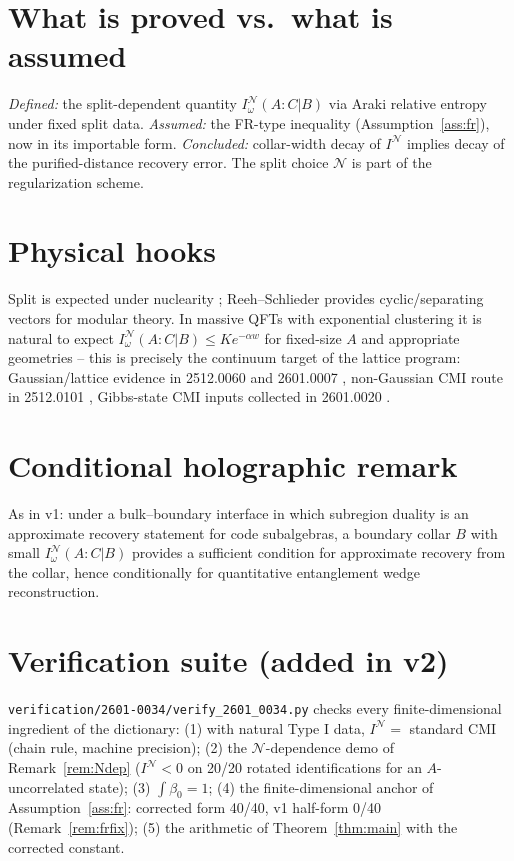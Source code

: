 \documentclass[11pt]{article}
\theoremstyle{remark}
\begin{document}
\section{What is proved vs.\ what is assumed}
\emph{Defined:} the split-dependent quantity $I^{\mathcal{N}}_\omega
(A:C|B)$ via Araki relative entropy under fixed split data.
\emph{Assumed:} the FR-type inequality (Assumption~\ref{ass:fr}), now in
its importable form. \emph{Concluded:} collar-width decay of
$I^{\mathcal{N}}$ implies decay of the purified-distance recovery error.
The split choice $\mathcal{N}$ is part of the regularization scheme.

\section{Physical hooks}
Split is expected under nuclearity \cite{BW}; Reeh--Schlieder provides
cyclic/separating vectors for modular theory. In massive QFTs with
exponential clustering it is natural to expect $I^{\mathcal{N}}_\omega
(A:C|B) \le K e^{-\alpha w}$ for fixed-size $A$ and appropriate
geometries -- this is precisely the continuum target of the lattice
program: Gaussian/lattice evidence in 2512.0060 \cite{S0060} and
2601.0007 \cite{S0007}, non-Gaussian CMI route in 2512.0101 \cite{S0101},
Gibbs-state CMI inputs collected in 2601.0020 \cite{S0020}.

\section{Conditional holographic remark}
As in v1: under a bulk--boundary interface in which subregion duality is
an approximate recovery statement for code subalgebras, a boundary collar
$B$ with small $I^{\mathcal{N}}_\omega(A:C|B)$ provides a sufficient
condition for approximate recovery from the collar, hence conditionally
for quantitative entanglement wedge reconstruction.

\section{Verification suite (added in v2)}
\label{sec:verif}
\texttt{verification/2601-0034/verify\_2601\_0034.py} checks every
finite-dimensional ingredient of the dictionary: (1) with natural Type I
data, $I^{\mathcal{N}} = $ standard CMI (chain rule, machine precision);
(2) the $\mathcal{N}$-dependence demo of Remark~\ref{rem:Ndep}
($I^{\mathcal{N}} < 0$ on 20/20 rotated identifications for an
$A$-uncorrelated state); (3) $\int \beta_0 = 1$; (4) the
finite-dimensional anchor of Assumption~\ref{ass:fr}: corrected form
40/40, v1 half-form 0/40 (Remark~\ref{rem:frfix}); (5) the arithmetic of
Theorem~\ref{thm:main} with the corrected constant.
\end{document}
